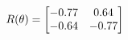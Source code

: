 \documentclass[preview]{standalone}
\begin{document}
\begin{align*}
\special{dvisvgm:raw <g id='unique000'>}R(\theta) = \begin{bmatrix}-0.77 & 0.64\\-0.64 & -0.77\end{bmatrix}\special{dvisvgm:raw </g>}
\end{align*}
\end{document}
